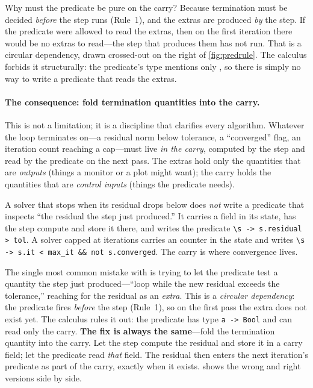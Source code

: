 Why must the predicate be pure on the carry? Because termination must be decided
\emph{before} the step runs (Rule~1), and the extras are produced \emph{by} the
step. If the predicate were allowed to read the extras, then on the first
iteration there would be no extras to read---the step that produces them has not
run. That is a circular dependency, drawn crossed-out on the right of
\cref{fig:predrule}. The calculus forbids it structurally: the predicate's type
mentions only , so there is simply no way to write a predicate that
reads the extras.

\paragraph{The consequence: fold termination quantities into the carry.} This is
not a limitation; it is a discipline that clarifies every algorithm. Whatever the
loop terminates on---a residual norm below tolerance, a ``converged'' flag, an
iteration count reaching a cap---must live \emph{in the carry}, computed by the
step and read by the predicate on the next pass. The extras hold only the
quantities that are \emph{outputs} (things a monitor or a plot might want); the
carry holds the quantities that are \emph{control inputs} (things the predicate
needs).

A solver that stops when its residual drops below  does \emph{not}
write a predicate that inspects ``the residual the step just produced.'' It
carries a  field in its state, has the step compute and store it
there, and writes the predicate
\lstinline[style=l4style]|\s -> s.residual > tol|. A solver capped at
 iterations carries an  counter in the state and writes
\lstinline[style=l4style]|\s -> s.it < max_it && not s.converged|. The carry is
where convergence lives.

\begin{pitfall}
The single most common mistake with  is trying to let the
predicate test a quantity the step just produced---``loop while the new residual
exceeds the tolerance,'' reaching for the residual as an \emph{extra}. This is a
\emph{circular dependency}: the predicate fires \emph{before} the step
(Rule~1), so on the first pass the extra does not exist yet. The calculus rules
it out: the predicate has type \lstinline[style=l4style]|a -> Bool| and can read
only the carry. \textbf{The fix is always the same}---fold the termination
quantity into the carry. Let the step compute the residual and store it in a
carry field; let the predicate read \emph{that} field. The residual then enters
the next iteration's predicate as part of the carry, exactly when it exists.
 shows the wrong and right versions side by side.
\end{pitfall}

